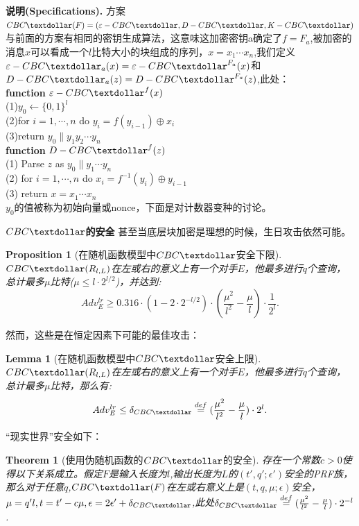 \documentclass[]{article}
\newtheorem{theorem}{Theorem}
\newtheorem{proposition}{Proposition}
\newtheorem{lemma}{Lemma}
\begin{document}
\textbf{{\large 说明(Specifications).}}  方案$CBC\textdollar(F)=(\varepsilon-CBC\textdollar,D-CBC\textdollar,K-CBC\textdollar)$与前面的方案有相同的密钥生成算法，这意味这加密密钥a确定了$f=F_a$,被加密的消息$x$可以看成一个$l$比特大小的块组成的序列，$x=x_1\cdots x_n$,我们定义$\varepsilon-CBC\textdollar_a(x)=\varepsilon-CBC\textdollar^{F_a}(x)$和$D-CBC\textdollar_a(z)=D-CBC\textdollar^{F_a}(z)$,此处：\\
\textbf{function} $\varepsilon-CBC\textdollar^f(x)$\\
(1)$y_0\leftarrow \{0,1\}^l$\\
(2)for $i=1,\cdots,n$ do $y_i=f(y_{i-1})\oplus x_i$\\
(3)return $y_0\parallel y_1y_2\cdots y_n$\\
\textbf{function} $D-CBC\textdollar^f(z)$\\
(1) Parse $z$ as $y_0 \parallel y_1\cdots y_n$\\
(2) for $i=1,\cdots,n$ do $x_i=f^{-1}(y_i)\oplus y_{i-1}$\\
(3) return $x=x_1\cdots x_n$\\
$y_0$的值被称为初始向量或nonce，下面是对计数器变种的讨论。

\textbf{{\large $CBC\textdollar$的安全}}  甚至当底层块加密是理想的时候，生日攻击依然可能。

\begin{proposition}[在随机函数模型中$CBC\textdollar$安全下限]\label{lb_CBC_RFM}
	$CBC\textdollar(R_{l,L})$在左或右的意义上有一个对手$E$，他最多进行$q$个查询，总计最多$\mu$比特($\mu \leq l\cdot 2^{l/2}$)，并达到:
	\[Adv^{lr}_{E} \geq 0.316\cdot (1-2\cdot 2^{-l/2})\cdot (\frac{\mu ^2}{l^2}-\frac{\mu}{l})\cdot \frac{1}{2^l}.\]
\end{proposition}

然而，这些是在恒定因素下可能的最佳攻击：

\begin{lemma}[在随机函数模型中$CBC\textdollar$安全上限]\label{ub_CBC_RFM}
	$CBC\textdollar(R_{l,L})$在左或右的意义上有一个对手$E$，他最多进行$q$个查询，总计最多$\mu$比特，那么有:
	\[Adv^{lr}_{E} \leq \delta_{CBC\textdollar} \stackrel{def}{=}(\frac{\mu ^2}{l^2}-\frac{\mu}{l})\cdot 2^l.\]
\end{lemma}

“现实世界”安全如下：

\begin{theorem}[使用伪随机函数的$CBC\textdollar$的安全]\label{CBC_PF}
	存在一个常数$c>0$使得以下关系成立。假定$F$是输入长度为$l$,输出长度为$L$的$(t',q';\epsilon')$安全的PRF族，那么对于任意$q$,$CBC\textdollar(F)$在左或右意义上是$(t,q,\mu;\epsilon)$安全，$\mu=q'l,t=t'-c\mu,\epsilon=2\epsilon'+\delta_{CBC\textdollar}$,此处$\delta_{CBC\textdollar}\stackrel{def}{=}(\frac{\mu^2}{l^2}-\frac{\mu}{l})\cdot 2^{-l}$.
\end{theorem}
\end{document}
